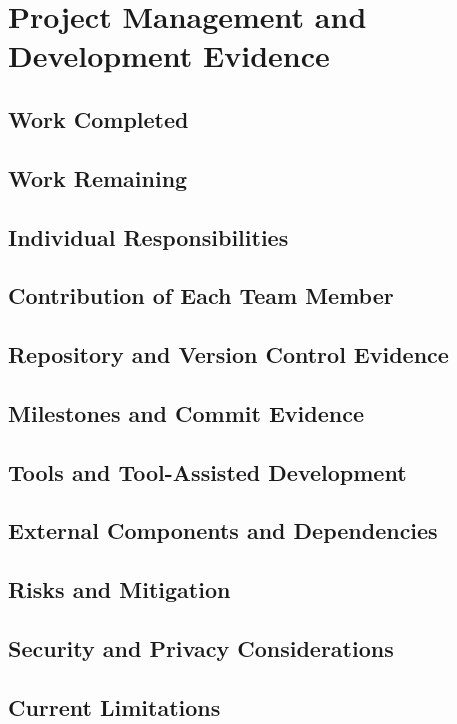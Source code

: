 \chapter{Project Management and Development Evidence}
\section{Work Completed}
\section{Work Remaining}
\section{Individual Responsibilities}
\section{Contribution of Each Team Member}
\section{Repository and Version Control Evidence}
\section{Milestones and Commit Evidence}
\section{Tools and Tool-Assisted Development}
\section{External Components and Dependencies}
\section{Risks and Mitigation}
\section{Security and Privacy Considerations}
\section{Current Limitations}
